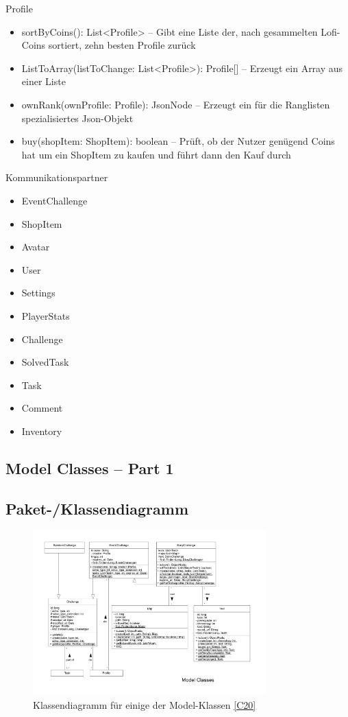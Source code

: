 \begin{class}{10}{Profile}
\begin{itemize}
\item sortByCoins(): List<Profile> -- Gibt eine Liste der, nach gesammelten Lofi-Coins sortiert, zehn besten Profile zurück
\item ListToArray(listToChange: List<Profile>): Profile[] -- Erzeugt ein Array aus einer Liste
\item ownRank(ownProfile: Profile): JsonNode -- Erzeugt ein für die Ranglisten spezialisiertes Json-Objekt
\item buy(shopItem: ShopItem): boolean -- Prüft, ob der Nutzer genügend Coins hat um ein ShopItem zu kaufen und führt dann den Kauf durch
\end{itemize}
\item[Kommunikationspartner]~\\
\begin{itemize}
\item EventChallenge
\item ShopItem
\item Avatar
\item User
\item Settings
\item PlayerStats
\item Challenge
\item SolvedTask
\item Task
\item Comment
\item Inventory
\end{itemize}
\end{class}

\newpage
\subsection{Model Classes -- Part 1}
\subsection{Paket-/Klassendiagramm}
\begin{figure}[h!]
\centering
\includegraphics[width=0.8\textwidth]{figures/KDChallenge}
\caption{Klassendiagramm für einige der Model-Klassen \ref{C20}}
\label{classC10}
\end{figure}
\clearpage
